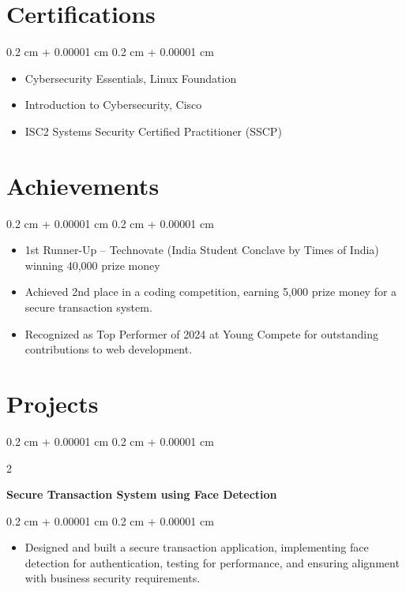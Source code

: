 \documentclass[10pt, letterpaper]{article}
\newenvironment{highlights}{
    \begin{itemize}[
        topsep=0.10 cm,
        parsep=0.10 cm,
        partopsep=0pt,
        itemsep=0pt,
        leftmargin=0.4 cm + 10pt
    ]
}{
    \end{itemize}
} %
\newenvironment{onecolentry}{
    \begin{adjustwidth}{
        0.2 cm + 0.00001 cm
    }{
        0.2 cm + 0.00001 cm
    }
}{
    \end{adjustwidth}
} %
\newenvironment{twocolentry}[2][]{
    \onecolentry
    \def\secondColumn{#2}
    \setcolumnwidth{\fill, 4.5 cm}
    \begin{paracol}{2}
}{
    \switchcolumn \raggedleft \secondColumn
    \end{paracol}
    \endonecolentry
} %
\begin{document}
    \section{Certifications}
    \begin{onecolentry}
        \begin{highlights}
            \item Cybersecurity Essentials, Linux Foundation
            \item Introduction to Cybersecurity, Cisco
            \item ISC2 Systems Security Certified Practitioner (SSCP)
        \end{highlights}
    \end{onecolentry}

    \section{Achievements}
    \begin{onecolentry}
        \begin{highlights}
            \item 1st Runner-Up – Technovate (India Student Conclave by Times of India) winning 40,000 prize money 
            \item Achieved 2nd place in a coding competition, earning 5,000 prize money for a secure transaction system.
            \item Recognized as Top Performer of 2024 at Young Compete for outstanding contributions to web development.
        \end{highlights}
    \end{onecolentry}

    \section{Projects}
    \begin{twocolentry}{}
        \textbf{Secure Transaction System using Face Detection}
    \end{twocolentry}
    \vspace{0.10 cm}
    \begin{onecolentry}
        \begin{highlights}
            \item Designed and built a secure transaction application, implementing face detection for authentication, testing for performance, and ensuring alignment with business security requirements.
        \end{highlights}
    \end{onecolentry}
\end{document}
